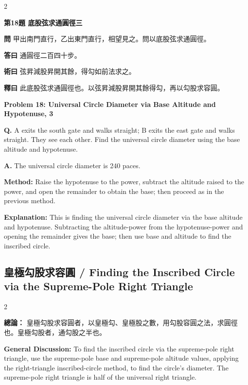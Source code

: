 \documentclass[11pt,a4paper]{article}
\newcommand{\wen}[1]{\noindent\textbf{問} #1\par\smallskip}
\newcommand{\da}[1]{\noindent\textbf{答曰} #1\par\smallskip}
\newcommand{\shu}[1]{\noindent\textbf{術曰} #1\par\smallskip}
\newcommand{\shi}[1]{\noindent\textbf{釋曰} #1\par\smallskip}
\newcommand{\wenE}[1]{\noindent\textbf{Q.} #1\par\smallskip}
\newcommand{\daE}[1]{\noindent\textbf{A.} #1\par\smallskip}
\newcommand{\shuE}[1]{\noindent\textbf{Method:} #1\par\smallskip}
\newcommand{\shiE}[1]{\noindent\textbf{Explanation:} #1\par\smallskip}
\begin{document}
\bigskip

\begin{paracol}{2}

\noindent\textbf{第18題 底股弦求通圓徑三}

\wen{甲出南門直行，乙出東門直行，相望見之。問以底股弦求通圓徑。}
\da{通圓徑二百四十步。}
\shu{弦昇減股昇開其餘，得勾如前法求之。}
\shi{此底股弦求通圓徑也。以弦昇減股昇開其餘得勾，再以勾股求容圓。}

\switchcolumn

\noindent\textbf{Problem 18: Universal Circle Diameter via Base Altitude and Hypotenuse, 3}

\wenE{A exits the south gate and walks straight; B exits the east gate and walks straight. They see each other. Find the universal circle diameter using the base altitude and hypotenuse.}
\daE{The universal circle diameter is 240 paces.}
\shuE{Raise the hypotenuse to the power, subtract the altitude raised to the power, and open the remainder to obtain the base; then proceed as in the previous method.}
\shiE{This is finding the universal circle diameter via the base altitude and hypotenuse. Subtracting the altitude-power from the hypotenuse-power and opening the remainder gives the base; then use base and altitude to find the inscribed circle.}

\end{paracol}

\clearpage

\subsection*{皇極勾股求容圓 / Finding the Inscribed Circle via the Supreme-Pole Right Triangle}

\begin{paracol}{2}

\noindent\textbf{總論：} 皇極勾股求容圓者，以皇極勾、皇極股之數，用勾股容圓之法，求圓徑也。皇極勾股者，通勾股之半也。

\switchcolumn

\noindent\textbf{General Discussion:} To find the inscribed circle via the supreme-pole right triangle, use the supreme-pole base and supreme-pole altitude values, applying the right-triangle inscribed-circle method, to find the circle's diameter. The supreme-pole right triangle is half of the universal right triangle.

\end{paracol}
\end{document}
